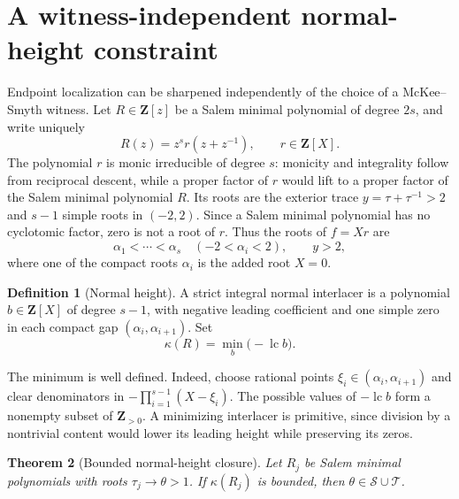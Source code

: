 \documentclass[11pt,reqno]{amsart}
\newtheorem{theorem}{Theorem}[section]
\theoremstyle{definition}
\newtheorem{definition}[theorem]{Definition}
\theoremstyle{remark}
\newcommand{\Z}{\mathbf Z}
\newcommand{\calS}{\mathcal S}
\newcommand{\calT}{\mathcal T}
\begin{document}
\section{A witness-independent normal-height constraint}

Endpoint localization can be sharpened independently of the choice of a
McKee--Smyth witness.  Let
$R\in\Z[z]$ be a Salem minimal polynomial of degree $2s$, and write uniquely
\begin{equation}\label{eq:tracepoly}
 R(z)=z^s r(z+z^{-1}),\qquad r\in\Z[X].
\end{equation}
The polynomial $r$ is monic irreducible of degree $s$: monicity and
integrality follow from reciprocal descent, while a proper factor of $r$
would lift to a proper factor of the Salem minimal polynomial $R$.  Its roots
are the exterior trace $y=\tau+\tau^{-1}>2$ and $s-1$ simple roots in
$(-2,2)$.  Since a Salem minimal polynomial has no cyclotomic factor, zero is
not a root of $r$.  Thus the roots of $f=Xr$ are
\[
 \alpha_1<\cdots<\alpha_s\quad(-2<\alpha_i<2),\qquad
 y>2,
\]
where one of the compact roots $\alpha_i$ is the added root $X=0$.

\begin{definition}[Normal height]
A strict integral normal interlacer is a polynomial
$b\in\Z[X]$ of degree $s-1$, with negative leading coefficient and one
simple zero in each compact gap $(\alpha_i,\alpha_{i+1})$.  Set
\begin{equation}\label{eq:kappa}
 \kappa(R)=\min_b\bigl(-\operatorname{lc}b\bigr).
\end{equation}
\end{definition}

The minimum is well defined.  Indeed, choose rational points
$\xi_i\in(\alpha_i,\alpha_{i+1})$ and clear denominators in
$-\prod_{i=1}^{s-1}(X-\xi_i)$.  The possible values of
$-\operatorname{lc}b$ form a nonempty subset of $\Z_{>0}$.  A minimizing
interlacer is primitive, since division by a nontrivial content would lower
its leading height while preserving its zeros.

\begin{theorem}[Bounded normal-height closure]\label{thm:heightclosure}
Let $R_j$ be Salem minimal polynomials with roots $\tau_j\to\theta>1$.  If
$\kappa(R_j)$ is bounded, then $\theta\in\calS\cup\calT$.
\end{theorem}
\end{document}
